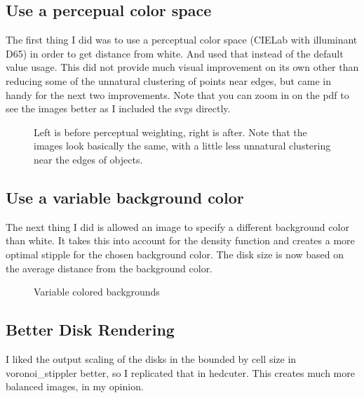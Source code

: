 \documentclass[11pt]{article}
\begin{document}
\subsection{Use a percepual color space}
The first thing I did was to use a perceptual color space (CIELab with
illuminant D65) in order to get distance from white. And used that
instead of the default value usage. This did not provide much visual
improvement on its own other than reducing some of the unnatural
clustering of points near edges, but came in handy for the next two
improvements. Note that you can zoom in on the pdf to see the images
better as I included the svgs directly.  \nocite{tree}

\begin{figure}[H]
  \centering
  \begin{minipage}{.5\textwidth}
    \centering
    
  \end{minipage}%
  \begin{minipage}{.5\textwidth}
    \centering
    
  \end{minipage}
  \caption{Left is before perceptual weighting, right is after. Note
    that the images look basically the same, with a little less
    unnatural clustering near the edges of objects.}
\end{figure}

\subsection{Use a variable background color}
The next thing I did is allowed an image to specify a different
background color than white. It takes this into account for the
density function and creates a more optimal stipple for the chosen
background color. The disk size is now based on the average distance
from the background color. 

\begin{figure}[H]
  \centering
  \begin{minipage}{.5\textwidth}
    \centering
    
  \end{minipage}%
  \begin{minipage}{.5\textwidth}
    \centering
    
  \end{minipage}
  \caption{Variable colored backgrounds}
\end{figure}

\subsection{Better Disk Rendering}
I liked the output scaling of the disks in the bounded by cell size in
voronoi\_stippler better, so I replicated that in hedcuter. This
creates much more balanced images, in my opinion.
\end{document}
